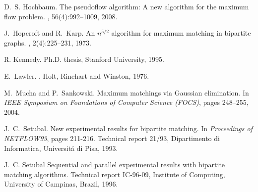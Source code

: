 \documentclass{article}
\begin{document}
\begin{thebibliography}{99}
D.~S. Hochbaum.
\newblock The pseudoflow algorithm: A new algorithm for the maximum flow problem.
, 56(4):992--1009, 2008.

J.~Hopcroft and R.~Karp.
\newblock An $n^{5/2}$ algorithm for maximum matching in bipartite graphs.
, 2(4):225--231, 1973.

\newblock R. Kennedy.
\newblock Ph.D. thesis, Stanford University, 1995.

E.~Lawler.
.
\newblock Holt, Rinehart and Winston, 1976.

M.~Mucha and P.~Sankowski.
\newblock Maximum matchings via Gaussian elimination.
\newblock In {\em IEEE Symposium on Foundations of Computer Science (FOCS)}, pages 248--255, 2004.

J.~C.~Setubal.
\newblock New experimental results for bipartite matching.
\newblock In {\em Proceedings of NETFLOW93},
\newblock pages 211-216.
\newblock Technical report 21/93, Dipartimento di Informatica, Universit\'a di Pisa, 1993.

J.~C. Setubal
\newblock Sequential and parallel experimental results with bipartite matching algorithms.
\newblock Technical report IC-96-09, Institute of Computing, University of Campinas, Brazil, 1996.

\end{thebibliography}

\newpage
\clearpage
\end{document}
